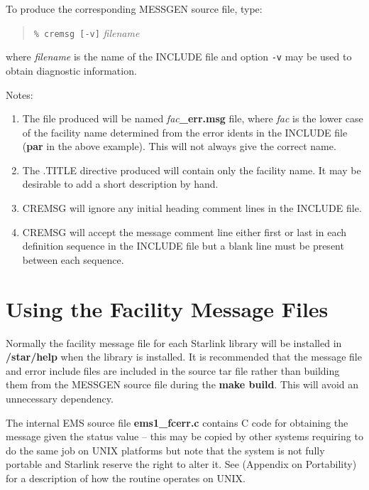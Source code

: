 To produce the corresponding MESSGEN source file, type:
\begin{quote}
\verb!% cremsg [-v]! {\em filename}
\end{quote}
where {\em filename} is the name of the INCLUDE file and option \verb!-v! may
be used to obtain diagnostic information.

Notes:
\begin{enumerate}
\item The file produced will be named {\em fac}{\bf \_err.msg} file, where 
{\em fac} is the lower case of the facility name determined from the error 
idents in the INCLUDE file ({\bf par} in the above example). This will not
always give the correct name.
\item The .TITLE directive produced will contain only the facility name. It
may be desirable to add a short description by hand.
\item CREMSG will ignore any initial heading comment lines in the INCLUDE file.
\item CREMSG will accept the message comment line either first or last in each
definition sequence in the INCLUDE file but a blank line must be present 
between each sequence.
\end{enumerate}

\section{Using the Facility Message Files}
Normally the facility message file for each Starlink library will be installed
in {\bf /star/help} when the library is installed. It is recommended that the
message file and error include files are included in the source tar file rather
than building them from the MESSGEN source file during the {\bf make build}.
This will avoid an unnecessary dependency.

The internal EMS source file {\bf ems1\_fcerr.c} contains C code for obtaining 
the message given the status value -- this may be copied by other systems 
requiring to do the same job on UNIX platforms but note that the system is not
fully portable and Starlink reserve the right to alter it. 
See 
(Appendix on Portability) for a description of how the routine operates on UNIX.

